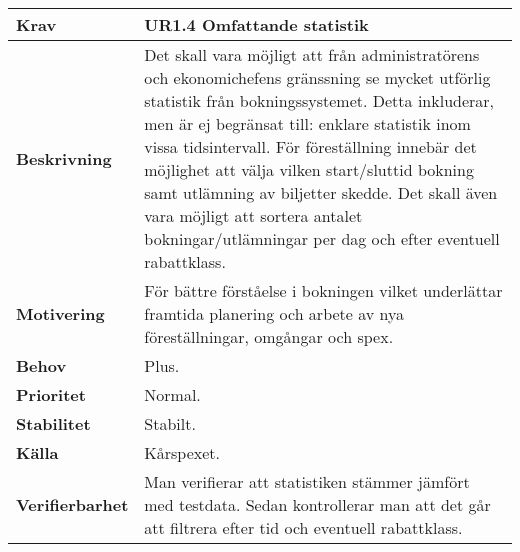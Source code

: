 \documentclass[a4paper, twoside, 11pt, titlepage]{article}
\begin{document}
		\begin {table} [ht] \begin{tabular} { p{2.6cm} p{12.5cm} }
			\hline
			{\sffamily\textbf{Krav}} & {\sffamily\textbf{UR1.4 Omfattande statistik }} \\
			\hline
			{\sffamily\textbf{Beskrivning}} & {Det skall vara möjligt att från administratörens och ekonomichefens gränssning se mycket utförlig statistik från bokningssystemet. Detta inkluderar, men är ej begränsat till: enklare statistik inom vissa tidsintervall. För föreställning innebär det möjlighet att välja vilken start/sluttid bokning samt utlämning av biljetter skedde. Det skall även vara möjligt att sortera antalet bokningar/utlämningar per dag och efter eventuell rabattklass.} \\
			\hline
			{\sffamily\textbf{Motivering}} & {För bättre förståelse i bokningen vilket underlättar framtida planering och arbete av nya föreställningar, omgångar och spex.} \\
			\hline
			{\sffamily\textbf{Behov}} & {Plus.} \\
			\hline
			{\sffamily\textbf{Prioritet}} & {Normal.} \\
			\hline
			{\sffamily\textbf{Stabilitet}} & {Stabilt.} \\
			\hline
			{\sffamily\textbf{Källa}} & {Kårspexet.} \\
			\hline
			{\sffamily\textbf{Verifierbarhet}} & {Man verifierar att statistiken stämmer jämfört med testdata. Sedan kontrollerar man att det går att filtrera efter tid och eventuell rabattklass.} \\
			\hline
		\end{tabular} \end{table} \FloatBarrier
		\vspace{6mm}
\end{document}
